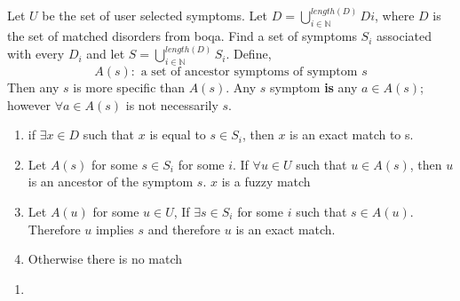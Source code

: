 \documentclass[11pt]{article}
\theoremstyle{plain}%
\theoremstyle{definition}
\theoremstyle{remark}
\newcommand{\N}{\mathbb{N}}
\begin{document}
Let $U$ be the set of user selected symptoms. Let $D = \bigcup_{i\in \N}^{length(D)}{Di}$, where $D$ is the set of matched disorders from boqa. Find a set of symptoms $S_i$ associated with every $D_i$ and let $S = \bigcup_{i\in \N}^{length(D)}{S_i}$. Define,
\[
  A(s): \text{ a set of ancestor symptoms of symptom } s
\]
Then any $s$ is more specific than $A(s)$. Any $s$ symptom \textbf{is} any $a\in A(s)$; however $\forall a \in A(s)$ is not necessarily $s$.

\begin{enumerate}
  \item if $\exists x\in D$ such that $x$ is equal to $s\in S_i$, then $x$ is an exact match to s.
  \item Let $A(s)$ for some $s\in S_i$ for some $i$. If $\forall u\in U$ such that $u\in A(s)$, then $u$ is an ancestor of the symptom $s$. $x$ is a fuzzy match
  \item Let $A(u)$ for some $u\in U$, If $\exists s\in S_i$ for some $i$ such that $s\in A(u)$. Therefore $u$ implies $s$ and therefore $u$ is an exact match.
  \item Otherwise there is no match
\end{enumerate}

\begin{enumerate}
  \item
\end{enumerate}




\end{document}
